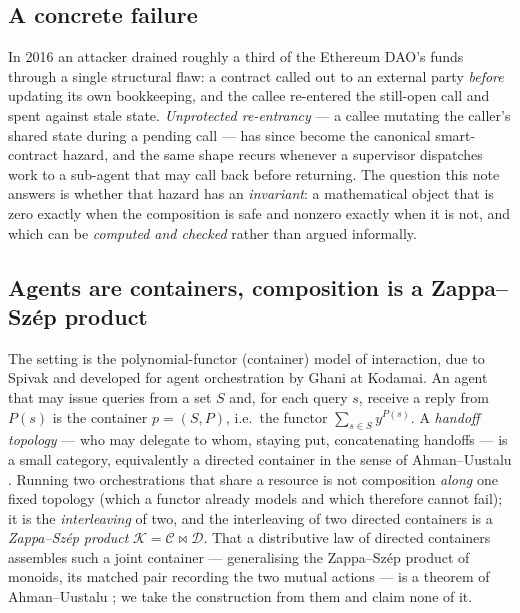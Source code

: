 \documentclass[11pt]{amsart}
\theoremstyle{definition}
\theoremstyle{remark}
\newcommand{\C}{\mathcal{C}}
\newcommand{\D}{\mathcal{D}}
\newcommand{\K}{\mathcal{K}}
\begin{document}
\subsection*{A concrete failure}
In 2016 an attacker drained roughly a third of the Ethereum DAO's funds through a single structural
flaw: a contract called out to an external party \emph{before} updating its own bookkeeping, and the
callee re-entered the still-open call and spent against stale state. \emph{Unprotected re-entrancy}
--- a callee mutating the caller's shared state during a pending call --- has since become the
canonical smart-contract hazard, and the same shape recurs whenever a supervisor dispatches work to a
sub-agent that may call back before returning. The question this note answers is whether that hazard
has an \emph{invariant}: a mathematical object that is zero exactly when the composition is safe and
nonzero exactly when it is not, and which can be \emph{computed and checked} rather than argued
informally.

\subsection*{Agents are containers, composition is a Zappa--Sz\'ep product}
The setting is the polynomial-functor (container) model of interaction, due to Spivak
\cite{NiuSpivak} and developed for agent orchestration by Ghani at Kodamai. An agent that may issue
queries from a set $S$ and, for each query $s$, receive a reply from $P(s)$ is the container
$p=(S,P)$, i.e.\ the functor $\sum_{s\in S}y^{P(s)}$. A \emph{handoff topology} --- who may delegate
to whom, staying put, concatenating handoffs --- is a small category, equivalently a directed
container in the sense of Ahman--Uustalu \cite{AhmanUustalu}. Running two orchestrations that share a
resource is not composition \emph{along} one fixed topology (which a functor already models and which
therefore cannot fail); it is the \emph{interleaving} of two, and the interleaving of two directed
containers is a \emph{Zappa--Sz\'ep product} $\K=\C\bowtie\D$. That a distributive law of directed
containers assembles such a joint container --- generalising the Zappa--Sz\'ep product of monoids, its
matched pair recording the two mutual actions --- is a theorem of Ahman--Uustalu \cite{AhmanUustaluDL};
we take the construction from them and claim none of it.
\end{document}
